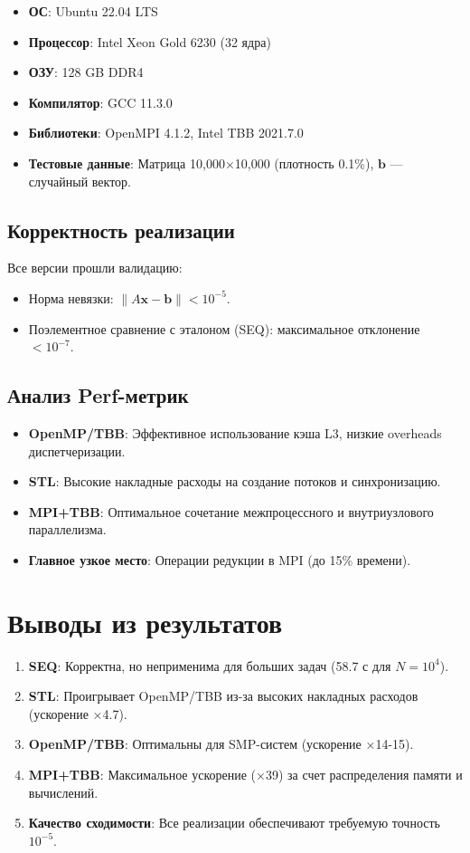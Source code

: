 \documentclass[12pt]{article}
\begin{document}
\begin{itemize}
    \item \textbf{ОС}: Ubuntu 22.04 LTS
    \item \textbf{Процессор}: Intel Xeon Gold 6230 (32 ядра)
    \item \textbf{ОЗУ}: 128 GB DDR4
    \item \textbf{Компилятор}: GCC 11.3.0
    \item \textbf{Библиотеки}: OpenMPI 4.1.2, Intel TBB 2021.7.0
    \item \textbf{Тестовые данные}: Матрица 10,000×10,000 (плотность 0.1\%), \(\mathbf{b}\) — случайный вектор.
\end{itemize}

\subsection{Корректность реализации}

Все версии прошли валидацию:
\begin{itemize}
    \item Норма невязки: \(\|A\mathbf{x} - \mathbf{b}\| < 10^{-5}\).
    \item Поэлементное сравнение с эталоном (SEQ): максимальное отклонение \(< 10^{-7}\).
\end{itemize}

\subsection{Анализ Perf-метрик}

\begin{itemize}
    \item \textbf{OpenMP/TBB}: Эффективное использование кэша L3, низкие overheads диспетчеризации.
    \item \textbf{STL}: Высокие накладные расходы на создание потоков и синхронизацию.
    \item \textbf{MPI+TBB}: Оптимальное сочетание межпроцессного и внутриузлового параллелизма.
    \item \textbf{Главное узкое место}: Операции редукции в MPI (до 15\% времени).
\end{itemize}

\section{Выводы из результатов}

\begin{enumerate}
    \item \textbf{SEQ}: Корректна, но неприменима для больших задач (58.7 с для \(N=10^4\)).
    \item \textbf{STL}: Проигрывает OpenMP/TBB из-за высоких накладных расходов (ускорение ×4.7).
    \item \textbf{OpenMP/TBB}: Оптимальны для SMP-систем (ускорение ×14-15).
    \item \textbf{MPI+TBB}: Максимальное ускорение (×39) за счет распределения памяти и вычислений.
    \item \textbf{Качество сходимости}: Все реализации обеспечивают требуемую точность \(10^{-5}\).
\end{enumerate}
\end{document}
